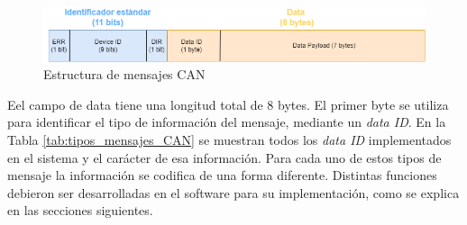 \begin{figure}[htbp]
	\centering
	\includegraphics[scale=.5]{./Figures/estructura_mensaje.png}
	\caption{Estructura de mensajes CAN}
	\label{fig:estructura_mensajes}
\end{figure}

Eel campo de data tiene una longitud total de 8 bytes. El primer byte se utiliza para identificar el tipo de información del mensaje, mediante un \textit{data ID}. En la Tabla \ref{tab:tipos_mensajes_CAN} se muestran todos los \textit{data ID} implementados en el sistema y el carácter de esa información. Para cada uno de estos tipos de mensaje la información se codifica de una forma diferente. Distintas funciones debieron ser desarrolladas en el software para su implementación, como se explica en las secciones siguientes.

